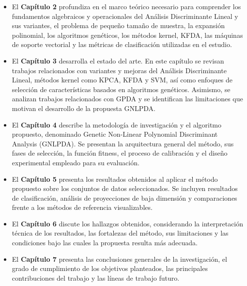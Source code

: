 	\begin{itemize}
		
		\item El \textbf{Capítulo 2} profundiza en el marco teórico necesario para comprender los fundamentos algebraicos y operacionales del Análisis Discriminante Lineal y sus variantes, el problema de pequeño tamaño de muestra, la expansión polinomial, los algoritmos genéticos, los métodos kernel, KFDA, las máquinas de soporte vectorial y las métricas de clasificación utilizadas en el estudio.
		
		\item El \textbf{Capítulo 3} desarrolla el estado del arte. En este capítulo se revisan trabajos relacionados con variantes y mejoras del Análisis Discriminante Lineal, métodos kernel como KPCA, KFDA y SVM, así como enfoques de selección de características basados en algoritmos genéticos. Asimismo, se analizan trabajos relacionados con GPDA y se identifican las limitaciones que motivan el desarrollo de la propuesta GNLPDA.
		
		\item El \textbf{Capítulo 4} describe la metodología de investigación y el algoritmo propuesto, denominado Genetic Non-Linear Polynomial Discriminant Analysis (GNLPDA). Se presentan la arquitectura general del método, sus fases de selección, la función fitness, el proceso de calibración y el diseño experimental empleado para su evaluación.
		
		\item El \textbf{Capítulo 5} presenta los resultados obtenidos al aplicar el método propuesto sobre los conjuntos de datos seleccionados. Se incluyen resultados de clasificación, análisis de proyecciones de baja dimensión y comparaciones frente a los métodos de referencia visualizables.
		
		\item El \textbf{Capítulo 6} discute los hallazgos obtenidos, considerando la interpretación técnica de los resultados, las fortalezas del método, sus limitaciones y las condiciones bajo las cuales la propuesta resulta más adecuada.
		
		\item El \textbf{Capítulo 7} presenta las conclusiones generales de la investigación, el grado de cumplimiento de los objetivos planteados, las principales contribuciones del trabajo y las líneas de trabajo futuro.
		
	\end{itemize}